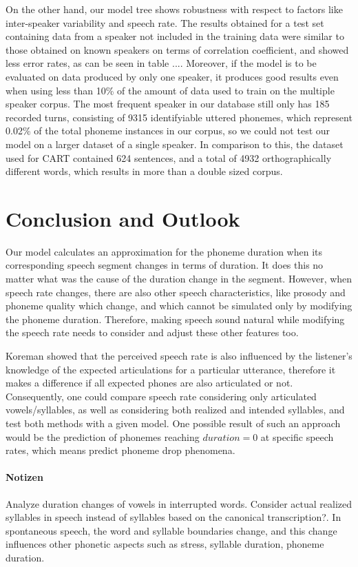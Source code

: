 \documentclass[a4paper]{scrreprt}
\begin{document}
On the other hand, our model tree shows robustness with respect to factors like inter-speaker variability and speech rate. The results obtained for a test set containing data from a speaker not included in the training data were similar to those obtained on known speakers on terms of correlation coefficient, and showed less error rates, as can be seen in table .... Moreover, if the model is to be evaluated on data produced by only one speaker, it produces good results even when using less than 10\% of the amount of data used to train on the multiple speaker corpus. The most frequent speaker in our database still only has 185 recorded turns, consisting of 9315 identifyiable uttered phonemes, which represent 0.02\% of the total phoneme instances in our corpus, so we could not test our model on a larger dataset of a single speaker. In comparison to this, the dataset used for CART contained 624 sentences, and a total of 4932 orthographically different words, which results in more than a double sized corpus.

\chapter{Conclusion and Outlook}
Our model calculates an approximation for the phoneme duration when its corresponding speech segment changes in terms of duration. It does this no matter what was the cause of the duration change in the segment. However, when speech rate changes, there are also other speech characteristics, like prosody and phoneme quality which change, and which cannot be simulated only by modifying the phoneme duration. Therefore, making speech sound natural while modifying the speech rate needs to consider and adjust these other features too.

Koreman showed \cite{Koreman_2006} that the perceived speech rate is also influenced by the listener's knowledge of the expected articulations for a particular utterance, therefore it makes a difference if all expected phones are also articulated or not. Consequently, one could compare speech rate considering only articulated vowels/syllables, as well as considering both realized and intended syllables, and test both methods with a given model. One possible result of such an approach would be the prediction of phonemes reaching $duration = 0$ at specific speech rates, which means predict phoneme drop phenomena.

\subsubsection*{Notizen}
Analyze duration changes of vowels in interrupted words.
Consider actual realized syllables in speech instead of syllables based on the canonical transcription?. In spontaneous speech, the word and syllable boundaries change, and this change influences other phonetic aspects such as stress, syllable duration, phoneme duration.

\printbibliography
\end{document}
